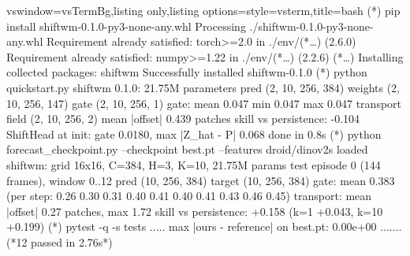 \vspace{0pt plus 1fill} %

\noindent\begin{minipage}{\linewidth}
\begin{tcblisting}{vswindow=vsTermBg,listing only,listing options={style=vsterm},title={\vsdots\hspace{2mm}bash}}
(*\vsprompt*) pip install shiftwm-0.1.0-py3-none-any.whl
Processing ./shiftwm-0.1.0-py3-none-any.whl
Requirement already satisfied: torch>=2.0 in ./env/(*\ldots*) (2.6.0)
Requirement already satisfied: numpy>=1.22 in ./env/(*\ldots*) (2.2.6)
(*\ldots*)
Installing collected packages: shiftwm
Successfully installed shiftwm-0.1.0
(*\vsprompt*) python quickstart.py
shiftwm 0.1.0: 21.75M parameters
pred (2, 10, 256, 384) weights (2, 10, 256, 147) gate (2, 10, 256, 1)
gate: mean 0.047  min 0.047  max 0.047
transport field (2, 10, 256, 2) mean |offset| 0.439 patches
skill vs persistence: -0.104
ShiftHead at init: gate 0.0180, max |Z_hat - P| 0.068
done in 0.8s
(*\vsprompt*) python forecast_checkpoint.py --checkpoint best.pt --features droid/dinov2s
loaded shiftwm: grid 16x16, C=384, H=3, K=10, 21.75M params
test episode 0 (144 frames), window 0..12
pred (10, 256, 384) target (10, 256, 384)
gate: mean 0.383  (per step: 0.26 0.30 0.31 0.40 0.41 0.40 0.41 0.43 0.46 0.45)
transport: mean |offset| 0.27 patches, max 1.72
skill vs persistence: +0.158  (k=1 +0.043, k=10 +0.199)
(*\vsprompt*) pytest -q -s tests
.....
max |ours - reference| on best.pt: 0.00e+00
.......
(*\textcolor{vsPrompt}{12 passed in 2.76s}*)
\end{tcblisting}
\label{fig:sw-term}
\end{minipage}\par
